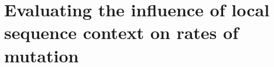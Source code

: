 \chapter{Evaluating the influence of local sequence context on rates of mutation}
\label{chpt:introduction}